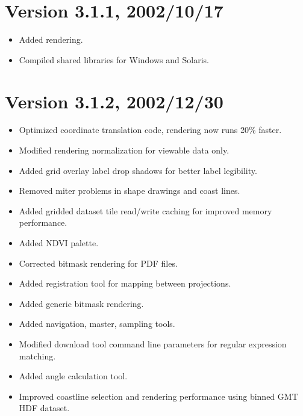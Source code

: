 

\section*{Version 3.1.1, 2002/10/17}

\begin{itemize}

  \item Added rendering.
 
  \item Compiled shared libraries for Windows and Solaris.

\end{itemize}




\section*{Version 3.1.2, 2002/12/30}

\begin{itemize}

  \item Optimized coordinate translation code, rendering now runs 20\%
  faster.

  \item Modified rendering normalization for viewable data only.

  \item Added grid overlay label drop shadows for better label
  legibility.

  \item Removed miter problems in shape drawings and coast lines.

  \item Added gridded dataset tile read/write caching for improved
  memory performance.

  \item Added NDVI palette.

  \item Corrected bitmask rendering for PDF files.

  \item Added registration tool for mapping between projections.

  \item Added generic bitmask rendering.

  \item Added navigation, master, sampling tools.

  \item Modified download tool command line parameters for regular
  expression matching.

  \item Added angle calculation tool.

  \item Improved coastline selection and rendering performance using
  binned GMT HDF dataset.

\end{itemize}


